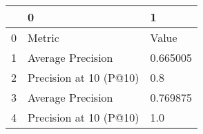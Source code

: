 \begin{tabular}{lll}
\toprule
{} &                       0 &         1 \\
\midrule
0 &                  Metric &     Value \\
1 &       Average Precision &  0.665005 \\
2 &  Precision at 10 (P@10) &       0.8 \\
3 &       Average Precision &  0.769875 \\
4 &  Precision at 10 (P@10) &       1.0 \\
\bottomrule
\end{tabular}
